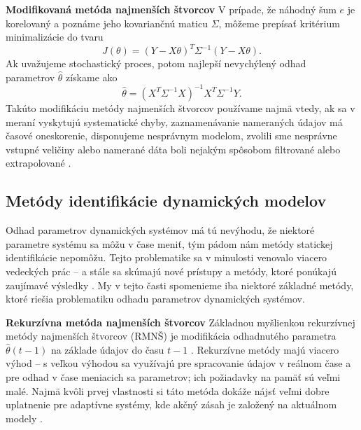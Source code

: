 \textbf{Modifikovaná metóda najmenších štvorcov}
\newline
V prípade, že náhodný šum $ e $ je korelovaný a poznáme jeho kovariančnú maticu $ \Sigma $, môžeme prepísať kritérium minimalizácie do tvaru 
\begin{equation}
	J\left(\theta\right) = \left(Y - X\theta \right)^T \Sigma^{-1} \left(Y - X\theta \right).
\end{equation}
Ak uvažujeme stochastický proces, potom najlepší nevychýlený odhad parametrov $ \hat{\theta} $ získame ako
\begin{equation}
	\hat{\theta} = \left(X^T \Sigma^{-1} X\right)^{-1}X^T \Sigma^{-1} Y.
\end{equation}
Takúto modifikáciu metódy najmenších štvorcov používame najmä vtedy, ak sa v meraní vyskytujú systematické chyby, zaznamenávanie nameraných údajov má časové oneskorenie, disponujeme nesprávnym modelom, zvolili sme nesprávne vstupné veličiny alebo namerané dáta boli nejakým spôsobom filtrované alebo extrapolované \cite{fikar:identifikacia:1999}. 

\subsection{Metódy identifikácie dynamických modelov}
Odhad parametrov dynamických systémov má tú nevýhodu, že niektoré parametre systému sa môžu v čase meniť, tým pádom nám metódy statickej identifikácie nepomôžu. Tejto problematike sa v minulosti venovalo viacero vedeckých prác \cite{mehrkanoon:dyn_param_est:2012} -- \cite{stortelder:dyn_param_est:1996} a stále sa skúmajú nové prístupy a metódy, ktoré ponúkajú zaujímavé výsledky \cite{hou:dyn_param_est_nn:2019}. My v tejto časti spomenieme iba niektoré základné metódy, ktoré riešia problematiku odhadu parametrov dynamických systémov.

\textbf{Rekurzívna metóda najmenších štvorcov}
\newline
Základnou myšlienkou rekurzívnej metódy najmenších štvorcov (RMNŠ) je modifikácia odhadnutého parametra $ \hat{\theta}(t-1) $ na základe údajov do času $ t-1 $ \cite{hostetter:recursive_est:1987}. Rekurzívne metódy majú viacero výhod -- s veľkou výhodou sa využívajú pre spracovanie údajov v reálnom čase a pre odhad v čase meniacich sa parametrov; ich požiadavky na pamäť sú veľmi malé. Najmä kvôli prvej vlastnosti si táto metóda dokáže nájsť veľmi dobre uplatnenie pre adaptívne systémy, kde akčný zásah je založený na aktuálnom modely \cite{koo:rmns:2019}.

